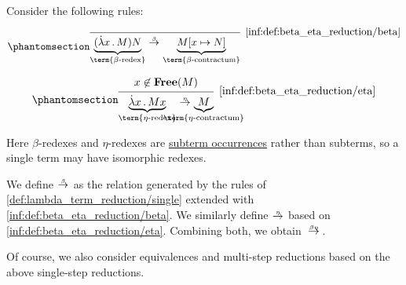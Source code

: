 \begin{definition}\label{def:beta_eta_reduction}
  Consider the following rules:
  \begin{paracol}{2}
    \begin{leftcolumn}
      \ParacolAlignmentHack
      \begin{equation*}\taglabel[\ensuremath{ \logic{Red}_\beta }]{inf:def:beta_eta_reduction/beta}
        \begin{prooftree}
          \infer0[\ref{inf:def:beta_eta_reduction/beta}]{ \underbrace{(\qabs x M) N}_{\T{\term{\( \beta \)-redex}}} \bred \underbrace{M[x \mapsto N]}_{\T{\term{\( \beta \)-contractum}}} },
        \end{prooftree}
      \end{equation*}
    \end{leftcolumn}

    \begin{rightcolumn}
      \ParacolAlignmentHack
      \begin{equation*}\taglabel[\ensuremath{ \logic{Red}_\eta }]{inf:def:beta_eta_reduction/eta}
        \begin{prooftree}
          \hypo{ x \not\in \op*{Free}(M) }
          \infer1[\ref{inf:def:beta_eta_reduction/eta}]{ \underbrace{\qabs x M x}_{\T{\term{\( \eta \)-redex}}} \ered \underbrace{M}_{\mathclap{\T{\term{\( \eta \)-contractum}}}} }.
        \end{prooftree}
      \end{equation*}
    \end{rightcolumn}
  \end{paracol}

  Here \( \beta \)-redexes and \( \eta \)-redexes are \hyperref[def:lambda_subterm_occurrence]{subterm occurrences} rather than subterms, so a single term may have isomorphic redexes.

  We define  \( {\bred} \) as the relation generated by the rules of \cref{def:lambda_term_reduction/single} extended with \ref{inf:def:beta_eta_reduction/beta}. We similarly define  \( {\ered} \) based on \ref{inf:def:beta_eta_reduction/eta}. Combining both, we obtain  \( {\redrel{\beta\eta}} \).
\end{definition}
\begin{comments}
  \item Of course, we also consider equivalences and multi-step reductions based on the above single-step reductions.
\end{comments}

